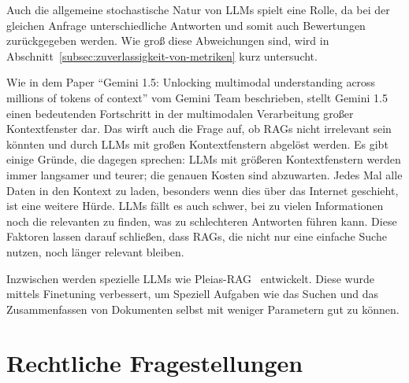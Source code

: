 Auch die allgemeine stochastische Natur von LLMs spielt eine Rolle, da bei der gleichen Anfrage unterschiedliche Antworten und somit auch Bewertungen zurückgegeben werden.
Wie groß diese Abweichungen sind, wird in Abschnitt~\ref{subsec:zuverlassigkeit-von-metriken} kurz untersucht.

Wie in dem Paper \enquote{Gemini 1.5: Unlocking multimodal understanding across millions of tokens of context} vom Gemini Team \cite{gemini2024v15} beschrieben, stellt Gemini 1.5 einen bedeutenden Fortschritt in der multimodalen Verarbeitung großer Kontextfenster dar. Das wirft auch die Frage auf, ob RAGs nicht irrelevant sein könnten und durch LLMs mit großen Kontextfenstern abgelöst werden.
Es gibt einige Gründe, die dagegen sprechen: LLMs mit größeren Kontextfenstern werden immer langsamer und teurer; die genauen Kosten sind abzuwarten. Jedes Mal alle Daten in den Kontext zu laden, besonders wenn dies über das Internet geschieht, ist eine weitere Hürde. LLMs fällt es auch schwer, bei zu vielen Informationen noch die relevanten zu finden, was zu schlechteren Antworten führen kann.
Diese Faktoren lassen darauf schließen, dass RAGs, die nicht nur eine einfache Suche nutzen, noch länger relevant bleiben.

Inzwischen werden spezielle LLMs wie Pleias-RAG~\cite{huggingface_pleias_rag_1b} entwickelt.
Diese wurde mittels Finetuning verbessert, um Speziell Aufgaben wie das Suchen und das Zusammenfassen von Dokumenten selbst mit weniger Parametern gut zu können.


\section{Rechtliche Fragestellungen}
\label{sec:rechtliche-fragestellungen}

